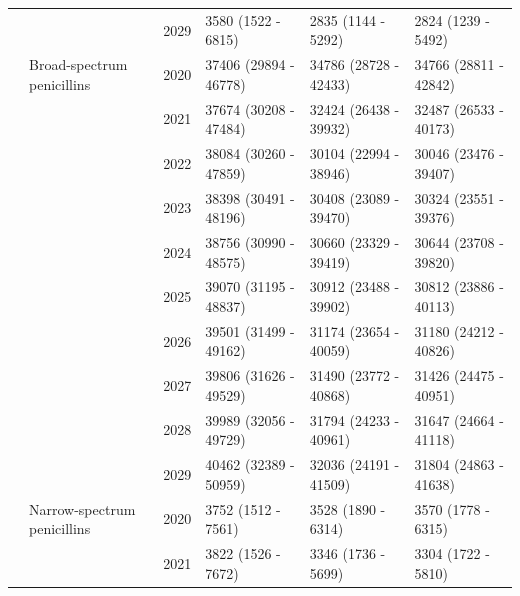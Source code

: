 \documentclass[
]{article}
\begin{document}
\begin{landscape}
\begin{longtable}[t]{llrlll}
\cmidrule{3-6}\nopagebreak
\hspace{1em} &  & 2029 & 3580 (1522 - 6815) & 2835 (1144 - 5292) & 2824 (1239 - 5492)\\
\cmidrule{2-6}\nopagebreak
\hspace{1em} & Broad-spectrum penicillins & 2020 & 37406 (29894 - 46778) & 34786 (28728 - 42433) & 34766 (28811 - 42842)\\
\cmidrule{3-6}\nopagebreak
\hspace{1em} &  & 2021 & 37674 (30208 - 47484) & 32424 (26438 - 39932) & 32487 (26533 - 40173)\\
\cmidrule{3-6}\nopagebreak
\hspace{1em} &  & 2022 & 38084 (30260 - 47859) & 30104 (22994 - 38946) & 30046 (23476 - 39407)\\
\cmidrule{3-6}\nopagebreak
\hspace{1em} &  & 2023 & 38398 (30491 - 48196) & 30408 (23089 - 39470) & 30324 (23551 - 39376)\\
\cmidrule{3-6}\nopagebreak
\hspace{1em} &  & 2024 & 38756 (30990 - 48575) & 30660 (23329 - 39419) & 30644 (23708 - 39820)\\
\cmidrule{3-6}\nopagebreak
\hspace{1em} &  & 2025 & 39070 (31195 - 48837) & 30912 (23488 - 39902) & 30812 (23886 - 40113)\\
\cmidrule{3-6}\nopagebreak
\hspace{1em} &  & 2026 & 39501 (31499 - 49162) & 31174 (23654 - 40059) & 31180 (24212 - 40826)\\
\cmidrule{3-6}\nopagebreak
\hspace{1em} &  & 2027 & 39806 (31626 - 49529) & 31490 (23772 - 40868) & 31426 (24475 - 40951)\\
\cmidrule{3-6}\nopagebreak
\hspace{1em} &  & 2028 & 39989 (32056 - 49729) & 31794 (24233 - 40961) & 31647 (24664 - 41118)\\
\cmidrule{3-6}\nopagebreak
\hspace{1em} &  & 2029 & 40462 (32389 - 50959) & 32036 (24191 - 41509) & 31804 (24863 - 41638)\\
\cmidrule{2-6}\nopagebreak
\hspace{1em} & Narrow-spectrum penicillins & 2020 & 3752 (1512 - 7561) & 3528 (1890 - 6314) & 3570 (1778 - 6315)\\
\cmidrule{3-6}\nopagebreak
\hspace{1em} &  & 2021 & 3822 (1526 - 7672) & 3346 (1736 - 5699) & 3304 (1722 - 5810)\\

\end{longtable}
\end{landscape}
\end{document}

